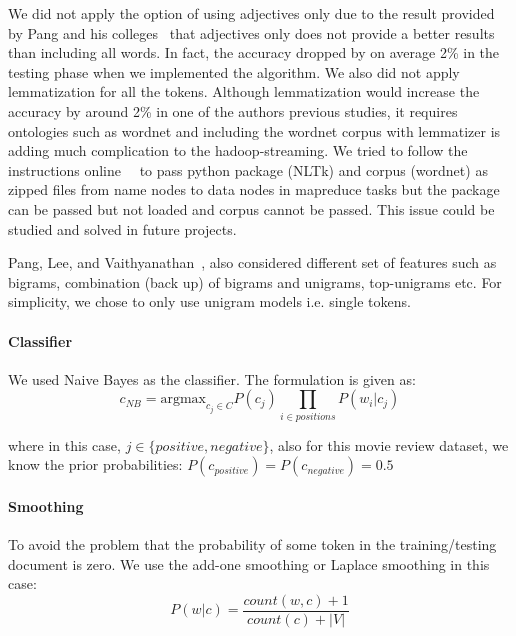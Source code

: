 We did not apply the option of using adjectives only due to the result 
provided by Pang and his 
colleges~\cite{hid-sp18-405-sentiment-pang2004asentimental} that  
adjectives only does not provide a better results than including all words. In 
fact, the accuracy dropped by on average 2\% in the testing phase when we 
implemented the algorithm. We also did not apply lemmatization for all the 
tokens. Although lemmatization would increase the accuracy by around 2\% 
in one of the authors previous studies, it requires ontologies such as 
wordnet and including the wordnet corpus with lemmatizer is adding much 
complication to the hadoop-streaming. We tried to follow the instructions 
online~\cite{hid-sp18-405-hadoopstreaming-nltk}~\cite{hid-sp18-405-hadoopstreaming-corpus}
 to pass python package (NLTk) and corpus (wordnet) as zipped files from 
name nodes to data nodes in mapreduce tasks but the package can be 
passed but not loaded and corpus cannot be passed. This issue could be 
studied and solved in future projects. 

Pang, Lee, and 
Vaithyanathan~\cite{hid-sp18-405-sentiment-pang2002thumbs}, also 
considered different set of 
features such as bigrams, combination (back up) of bigrams and unigrams, 
top-unigrams etc. For simplicity, we chose to only use unigram models i.e. 
single tokens. 

\paragraph{Classifier}
We  used Naive Bayes as the classifier. The formulation is given as:
\begin{equation}\label{eq:nb}
c_{NB}=\text{argmax}_{c_j \in C} P(c_j) \prod_{i \in positions} P(w_i|c_j)
\end{equation}

where in this case, $j \in \{positive, negative\}$, also for this movie review 
dataset, we know the prior probabilities: 
$P(c_{positive})=P(c_{negative})=0.5$

\paragraph{Smoothing}
To avoid the problem that the probability of some token in the 
training/testing document is zero. We use the add-one smoothing or Laplace 
smoothing in this case:
\begin{equation}\label{eq:sm}
P(w|c) = \frac{count(w,c) + 1}{count(c) + |V|}
\end{equation}

